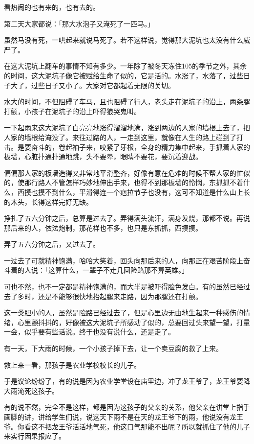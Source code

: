 \documentclass[UTF8]{ctexart}
\begin{document}
看热闹的也有来的，也有去的。

第二天大家都说：「那大水泡子又淹死了一匹马。」

虽然马没有死，一哄起来就说马死了。若不这样说，觉得那大泥坑也太没有什么威严了。

在这大泥坑上翻车的事情不知有多少。一年除了被冬天冻住105的季节之外，其余的时间，这大泥坑子像它被赋给生命了似的，它是活的。水涨了，水落了，过些日子大了，过些日子又小了。大家对它都起着无限的关切。

水大的时间，不但阻碍了车马，且也阻碍了行人，老头走在泥坑子的沿上，两条腿打颤，小孩子在泥坑子的沿上吓得狼哭鬼叫。

一下起雨来这大泥坑子白亮亮地涨得溜溜地满，涨到两边的人家的墙根上去了，把人家的墙根给淹没了。来往过路的人，一走到这里，就像在人生的路上碰到了打击。是要奋斗的，卷起袖子来，咬紧了牙根，全身的精力集中起来，手抓着人家的板墙，心脏扑通扑通地跳，头不要晕，眼睛不要花，要沉着迎战。

偏偏那人家的板墙造得又非常地平滑整齐，好像有意在危难的时候不帮人家的忙似的，使那行路人不管怎样巧妙地伸出手来，也得不到那板墙的怜悯，东抓抓不着什么，西摸也摸不到什么，平滑得连一个疤拉节子也没有，这可不知道是什么山上长的木头，长得这样完好无缺。

挣扎了五六分钟之后，总算是过去了。弄得满头流汗，满身发烧，那都不说。再说那后来的人，依法炮制，那花样也不多，也只是东抓抓，西摸摸。

弄了五六分钟之后，又过去了。

一过去了可就精神饱满，哈哈大笑着，回头向那后来的人，向那正在艰苦阶段上奋斗着的人说：「这算什么，一辈子不走几回险路那不算英雄。」

可也不然，也不一定都是精神饱满的，而大半是被吓得脸色发白。有的虽然已经过去了多时，还是不能够很快地抬起腿来走路，因为那腿还在打颤。

这一类胆小的人，虽然是险路已经过去了，但是心里边无由地生起来一种感伤的情绪，心里颤抖抖的，好像被这大泥坑子所感动了似的，总要回过头来望一望，打量一会，似乎要有些话说。终于也没有说什么，还是走了。

有一天，下大雨的时候，一个小孩子掉下去，让一个卖豆腐的救了上来。

救上来一看，那孩子是农业学校校长的儿子。

于是议论纷纷了，有的说是因为农业学堂设在庙里边，冲了龙王爷了，龙王爷要降大雨淹死这孩子。

有的说不然，完全不是这样，都是因为这孩子的父亲的关系，他父亲在讲堂上指手画脚的讲，讲给学生们说，说这天下雨不是在天的龙王爷下的雨，他说没有龙王爷。你看这不把龙王爷活活地气死，他这口气那能不出呢？所以就抓住了他的儿子来实行因果报应了。
\end{document}

